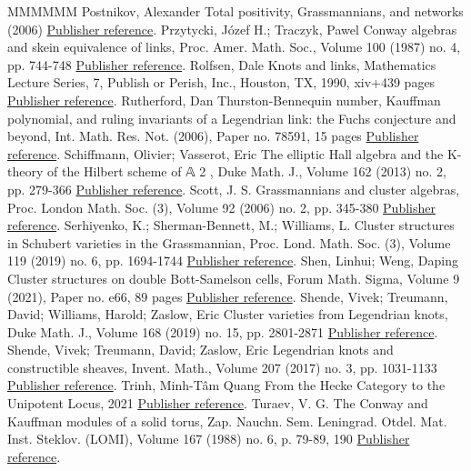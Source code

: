 \documentclass[11pt]{article}
\theoremstyle{definition}
\numberwithin{equation}{section}
\begin{document}
\begin{thebibliography}{MMMMMM}
 Postnikov, Alexander Total positivity, Grassmannians, and networks (2006) \href{https://alco.centre-mersenne.org/articles/10.5802/alco.345/#Pos}{Publisher reference}.
 Przytycki, Józef H.; Traczyk, Pawel Conway algebras and skein equivalence of links, Proc. Amer. Math. Soc., Volume 100 (1987) no. 4, pp. 744-748 \href{https://alco.centre-mersenne.org/articles/10.5802/alco.345/#PT}{Publisher reference}.
 Rolfsen, Dale Knots and links, Mathematics Lecture Series, 7, Publish or Perish, Inc., Houston, TX, 1990, xiv+439 pages \href{https://alco.centre-mersenne.org/articles/10.5802/alco.345/#Rolfsen}{Publisher reference}.
 Rutherford, Dan Thurston-Bennequin number, Kauffman polynomial, and ruling invariants of a Legendrian link: the Fuchs conjecture and beyond, Int. Math. Res. Not. (2006), Paper no. 78591, 15 pages \href{https://alco.centre-mersenne.org/articles/10.5802/alco.345/#Ruth}{Publisher reference}.
 Schiffmann, Olivier; Vasserot, Eric The elliptic Hall algebra and the K-theory of the Hilbert scheme of 𝔸 2 , Duke Math. J., Volume 162 (2013) no. 2, pp. 279-366 \href{https://alco.centre-mersenne.org/articles/10.5802/alco.345/#ScVa}{Publisher reference}.
 Scott, J. S. Grassmannians and cluster algebras, Proc. London Math. Soc. (3), Volume 92 (2006) no. 2, pp. 345-380 \href{https://alco.centre-mersenne.org/articles/10.5802/alco.345/#Scott}{Publisher reference}.
 Serhiyenko, K.; Sherman-Bennett, M.; Williams, L. Cluster structures in Schubert varieties in the Grassmannian, Proc. Lond. Math. Soc. (3), Volume 119 (2019) no. 6, pp. 1694-1744 \href{https://alco.centre-mersenne.org/articles/10.5802/alco.345/#SSBW}{Publisher reference}.
 Shen, Linhui; Weng, Daping Cluster structures on double Bott-Samelson cells, Forum Math. Sigma, Volume 9 (2021), Paper no. e66, 89 pages \href{https://alco.centre-mersenne.org/articles/10.5802/alco.345/#SW}{Publisher reference}.
 Shende, Vivek; Treumann, David; Williams, Harold; Zaslow, Eric Cluster varieties from Legendrian knots, Duke Math. J., Volume 168 (2019) no. 15, pp. 2801-2871 \href{https://alco.centre-mersenne.org/articles/10.5802/alco.345/#STWZ}{Publisher reference}.
 Shende, Vivek; Treumann, David; Zaslow, Eric Legendrian knots and constructible sheaves, Invent. Math., Volume 207 (2017) no. 3, pp. 1031-1133 \href{https://alco.centre-mersenne.org/articles/10.5802/alco.345/#STZ}{Publisher reference}.
 Trinh, Minh-Tâm Quang From the Hecke Category to the Unipotent Locus, 2021 \href{https://alco.centre-mersenne.org/articles/10.5802/alco.345/#Trinh}{Publisher reference}.
 Turaev, V. G. The Conway and Kauffman modules of a solid torus, Zap. Nauchn. Sem. Leningrad. Otdel. Mat. Inst. Steklov. (LOMI), Volume 167 (1988) no. 6, p. 79-89, 190 \href{https://alco.centre-mersenne.org/articles/10.5802/alco.345/#Turaev}{Publisher reference}.
\end{thebibliography}
\end{document}
